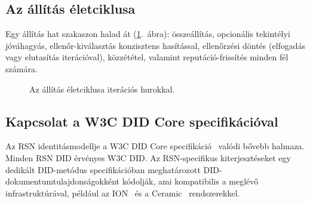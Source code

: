 \documentclass[11pt,a4paper,twocolumn]{article}
\begin{document}
\subsection{Az állítás életciklusa}

Egy állítás hat szakaszon halad át (\ref{fig:lifecycle}.~ábra): összeállítás, opcionális tekintélyi jóváhagyás, ellenőr-kiválasztás konzisztens hasítással, ellenőrzési döntés (elfogadás vagy elutasítás iterációval), közzététel, valamint reputáció-frissítés minden fél számára.

\begin{figure}[ht]
\centering
{}
\caption{Az állítás életciklusa iterációs hurokkal.}
\label{fig:lifecycle}
\end{figure}

\subsection{Kapcsolat a W3C DID Core specifikációval}

Az RSN identitásmodellje a W3C DID Core specifikáció~\cite{did2022} valódi bővebb halmaza. Minden RSN DID érvényes W3C DID. Az RSN-specifikus kiterjesztéseket egy dedikált DID-metódus specifikációban meghatározott DID-dokumentumtulajdonságokként kódolják, ami kompatibilis a meglévő infrastruktúrával, például az ION~\cite{buchner2021} és a Ceramic~\cite{ceramic2023} rendszerekkel.
\end{document}
